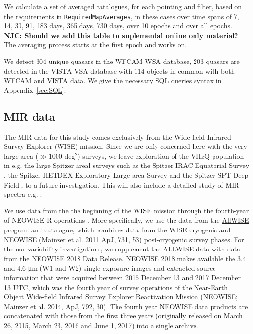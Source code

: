 \documentclass[usenatbib]{mnras}
\begin{document}
    We calculate a set of averaged catalogues, for each pointing and filter, based
    on the requirements in \verb+RequiredMapAverages+, in these cases over time
    spans of 7, 14, 30, 91, 183 days, 365 days, 730 days, over 10 epochs and
    over all epochs. {\bf NJC: Should we add this table to suplemental online
    only material?} The averaging process starts at the first epoch and works on.

    We detect 304 unique quasars in the WFCAM WSA database, 203 quasars are 
    detected in the VISTA VSA database with 114 objects in common with both
    WFCAM and VISTA data.  We give the necessary SQL queries syntax in Appendix~\ref{sec:SQL}.



\subsection{MIR data}
The MIR data for this study comes exclusively from the Wide-field
Infrared Survey Explorer (WISE) mission. Since we are only concerned
here with the very large area ($\gg1000$ deg$^2$) surveys, we leave
exploration of the VH$z$Q population in e.g. the large Spitzer areal
surveys such as the Spitzer IRAC Equatorial Survey \citep[SpIES;
][]{Timlin2016}, the Spitzer-HETDEX Exploratory Large-area Survey
\citep[SHELA; ][]{Papovich2016} and the Spitzer-SPT Deep Field
\citep[SSDF; ][]{Ashby2013}, to a future investigation. This will also
include a detailed study of MIR spectra e.g. \citet{Lambrides2018}.

We use data from the the beginning of the WISE mission \citep[2010
January; ][]{Wright2010} through the fourth-year of NEOWISE-R
operations \citep[2017 December;]{Mainzer2011}. More specifically, we
use the data from the
\href{http://wise2.ipac.caltech.edu/docs/release/allwise/}{AllWISE}
program and catalogue, which combines data from the WISE cryogenic and
NEOWISE (Mainzer et al. 2011 ApJ, 731, 53) post-cryogenic survey
phases. For the our variability investigations, we supplement the
ALLWISE data with data from the
\href{http://wise2.ipac.caltech.edu/docs/release/neowise/neowise_2018_release_intro.html}{NEOWISE
2018 Data Release}. NEOWISE 2018 makes available the 3.4 and 4.6 μm
(W1 and W2) single-exposure images and extracted source information
that were acquired between 2016 December 13 and 2017 December 13 UTC,
which was the fourth year of survey operations of the Near-Earth
Object Wide-field Infrared Survey Explorer Reactivation Mission
(NEOWISE; Mainzer et al. 2014, ApJ, 792, 30). The fourth year NEOWISE
data products are concatenated with those from the first three years
(originally released on March 26, 2015, March 23, 2016 and June 1,
2017) into a single archive.
\end{document}
